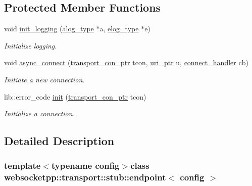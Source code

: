 \subsection*{Protected Member Functions}
\begin{DoxyCompactItemize}
\item 
void \hyperlink{classwebsocketpp_1_1transport_1_1stub_1_1endpoint_ad64a58ebd03fe9e55d19ec8d27bcaac9}{init\+\_\+logging} (\hyperlink{classwebsocketpp_1_1transport_1_1stub_1_1endpoint_aa62a4dd626d9b8757972c0ef66e72419}{alog\+\_\+type} $\ast$a, \hyperlink{classwebsocketpp_1_1transport_1_1stub_1_1endpoint_a7890584ddff40571589f62c52bc5b080}{elog\+\_\+type} $\ast$e)
\begin{DoxyCompactList}\small\item\em Initialize logging. \end{DoxyCompactList}\item 
void \hyperlink{classwebsocketpp_1_1transport_1_1stub_1_1endpoint_ad912ae8113d6c879fab22daaeba964b9}{async\+\_\+connect} (\hyperlink{classwebsocketpp_1_1transport_1_1stub_1_1endpoint_af2bad83f2577d578712642e11767efe1}{transport\+\_\+con\+\_\+ptr} tcon, \hyperlink{namespacewebsocketpp_aae370ea5ac83a8ece7712cb39fc23f5b}{uri\+\_\+ptr} u, \hyperlink{namespacewebsocketpp_1_1transport_ac392fca34e946b48414278c0c3addfa5}{connect\+\_\+handler} cb)
\begin{DoxyCompactList}\small\item\em Initiate a new connection. \end{DoxyCompactList}\item 
lib\+::error\+\_\+code \hyperlink{classwebsocketpp_1_1transport_1_1stub_1_1endpoint_a9931019b90c1e7b162d9fb7d39d5b3a2}{init} (\hyperlink{classwebsocketpp_1_1transport_1_1stub_1_1endpoint_af2bad83f2577d578712642e11767efe1}{transport\+\_\+con\+\_\+ptr} tcon)
\begin{DoxyCompactList}\small\item\em Initialize a connection. \end{DoxyCompactList}\end{DoxyCompactItemize}


\subsection{Detailed Description}
\subsubsection*{template$<$typename config$>$class websocketpp\+::transport\+::stub\+::endpoint$<$ config $>$}



